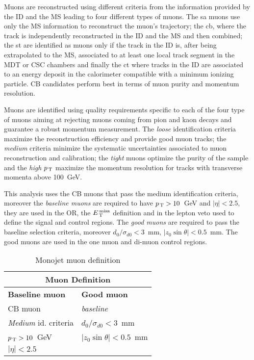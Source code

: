 Muons are reconstructed using different criteria from the information provided
by the ID and the MS leading to four different types of muons. The \gls{sa}
muons use only the MS information to reconstruct the muon's trajectory; the
\gls{cb}, where the track is independently reconstructed in the ID and the MS
and then combined; the \gls{st} are identified as muons only if the track in the
ID is, after being extrapolated to the MS, associated to at least one local
track segment in the MDT or CSC chambers and finally the \gls{ct} where tracks
in the ID are associated to an energy deposit in the calorimeter compatible with
a minimum ionizing particle. CB candidates perform best in terms of muon purity
and momentum resolution.

Muons are identified using quality requirements specific to each of the four
type of muons aiming at rejecting muons coming from pion and kaon decays and
guarantee a robust momentum measurement. The \emph{loose} identification
criteria maximize the reconstruction efficiency and provide good muon tracks;
the \emph{medium} criteria minimize the systematic uncertainties associated to
muon reconstruction and calibration; the \emph{tight} muons optimize the purity
of the sample and the \emph{high $p_\mathrm{\, T}$} maximize the momentum resolution for
tracks with transverse momenta above 100~GeV\cite{MUONS}.

This analysis uses the CB muons that pass the medium identification criteria,
moreover the \emph{baseline muons} are required to have $p_\mathrm{\, T} > 10$~GeV and
$|\eta| < 2.5$, they are used in the OR, the $E_\mathrm{\, T}^\mathrm{\, miss}$ definition and in the lepton
veto used to define the signal and control regions. The \emph{good muons} are
required to pass the baseline selection criteria, moreover $d_0 / \sigma_{d0} <
3$~mm, $|z_0 \sin \theta| < 0.5$~mm. The good muons are used in the one muon and
di-muon control regions.

\begin{table}[!th]
  \centering
  \begin{tabular}{ll}
    \toprule
    \multicolumn{2}{c}{Muon Definition} \\
    \midrule \midrule
    \textbf{Baseline muon} & \textbf{Good muon} \\
    \midrule
    CB muon & \emph{baseline} \\
    \emph{Medium} id. criteria & $d_0 / \sigma_{d0} < 3$~mm \\
    $p_\mathrm{\, T} > 10$~GeV & $|z_0 \sin \theta| < 0.5$~mm \\
    $|\eta| < 2.5$ & \\
    \bottomrule
  \end{tabular}
  \caption{Monojet muon definition}
  \label{tab:ele_def}
\end{table}
